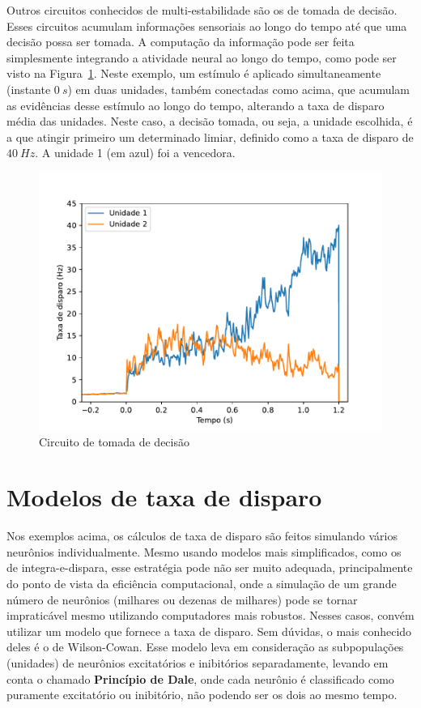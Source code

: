 Outros circuitos conhecidos de multi-estabilidade são os de tomada de decisão. Esses circuitos acumulam informações sensoriais ao longo do tempo até que uma decisão possa ser tomada. A computação da informação pode ser feita simplesmente integrando a atividade neural ao longo do tempo,
como pode ser visto na Figura~\ref{fig:tomadadecisao}. Neste exemplo, um estímulo é aplicado simultaneamente (instante $0\ s$) em duas unidades, também conectadas como acima, que acumulam as evidências desse estímulo ao longo do tempo, alterando a taxa de disparo média das unidades. Neste caso, a decisão tomada, ou seja, a unidade escolhida, é a que atingir primeiro um determinado limiar, definido como a taxa de disparo de $40\ Hz$. A unidade 1 (em azul) foi a vencedora.
\begin{figure}[tb]
	\centering
	\caption[Circuito de tomada de decisão]{Circuito de tomada de decisão}
	\label{fig:tomadadecisao}
	\includegraphics[width=0.7\linewidth]{figs/tomada_decisao}
\end{figure}

\section{Modelos de taxa de disparo}\label{sec:modelostaxa}
Nos exemplos acima, os cálculos de taxa de disparo são feitos simulando vários neurônios individualmente. Mesmo usando modelos mais simplificados, como os de integra-e-dispara, esse estratégia pode não ser muito adequada, principalmente do ponto de vista da eficiência computacional, onde a simulação de um grande número de neurônios (milhares ou dezenas de milhares) pode se tornar impraticável mesmo utilizando computadores mais robustos. Nesses casos, convém utilizar um modelo que fornece a taxa de disparo. Sem dúvidas, o mais conhecido deles é o de Wilson-Cowan.
Esse modelo leva em consideração as subpopulações (unidades) de neurônios excitatórios e inibitórios separadamente, levando em conta o chamado \textbf{Princípio de Dale}, onde cada neurônio é classificado como puramente excitatório ou inibitório, não podendo ser os dois ao mesmo tempo.

